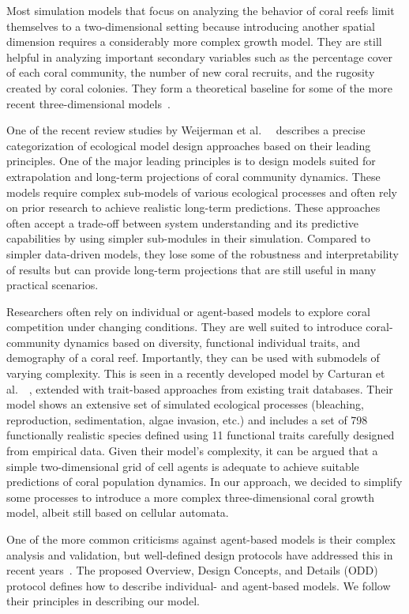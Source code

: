 \documentclass[9pt]{pnas-new}
\renewcommand{\etal}{et al.\ }
\newcommand{\etc}{etc.}
\begin{document}
Most simulation models that focus on analyzing the behavior of coral reefs limit themselves to a two-dimensional setting because introducing another spatial dimension requires a considerably more complex growth model. They are still helpful in analyzing important secondary variables such as the percentage cover of each coral community, the number of new coral recruits, and the rugosity created by coral colonies. They form a theoretical baseline for some of the more recent three-dimensional models~\cite{coral_community_3D}.

One of the recent review studies by Weijerman \etal~\cite{coral_models_review} describes a precise categorization of ecological model design approaches based on their leading principles. One of the major leading principles is to design models suited for extrapolation and long-term projections of coral community dynamics. These models require complex sub-models of various ecological processes and often rely on prior research to achieve realistic long-term predictions. These approaches often accept a trade-off between system understanding and its predictive capabilities by using simpler sub-modules in their simulation. Compared to simpler data-driven models, they lose some of the robustness and interpretability of results but can provide long-term projections that are still useful in many practical scenarios.

Researchers often rely on individual or agent-based models to explore coral competition under changing conditions. They are well suited to introduce coral-community dynamics based on diversity, functional individual traits, and demography of a coral reef. Importantly, they can be used with submodels of varying complexity. This is seen in a recently developed model by Carturan \etal~\cite{coral_community_main}, extended with trait-based approaches from existing trait databases. Their model shows an extensive set of simulated ecological processes (bleaching, reproduction, sedimentation, algae invasion, \etc) and includes a set of 798 functionally realistic species defined using 11 functional traits carefully designed from empirical data. Given their model's complexity, it can be argued that a simple two-dimensional grid of cell agents is adequate to achieve suitable predictions of coral population dynamics. In our approach, we decided to simplify some processes to introduce a more complex three-dimensional coral growth model, albeit still based on cellular automata.

One of the more common criticisms against agent-based models is their complex analysis and validation, but well-defined design protocols have addressed this in recent years~\cite{agent_based_validation}. The proposed Overview, Design Concepts, and Details (ODD) protocol defines how to describe individual- and agent-based models. We follow their principles in describing our model.
\end{document}
